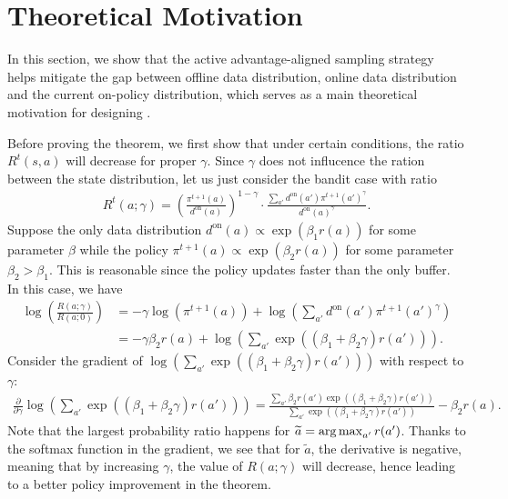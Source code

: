 \section{Theoretical Motivation}\label{app:theory_proof}
In this section, we show that the active advantage-aligned sampling strategy
helps mitigate the gap between offline data distribution, online data distribution and the current on-policy distribution, which serves as a main theoretical motivation for designing \algname.

\perfdiff*

Before proving the theorem, we first show that under certain conditions, the ratio $R^t(s, a)$ will decrease for proper $\gamma$. Since $\gamma$ does not influcence the ration between the state distribution, let us just consider the bandit case with ratio 
\begin{align*}
    R^t(a;\gamma) = \left(\frac{{\pi^{t+1}}(a)}{d^{\text{on}}(a)}\right)^{1-\gamma}  \cdot \frac{\sum_{a'}d^{\text{on}}(a') \pi^{t+1}(a')^\gamma}{d^{\text{on}}(a)^\gamma}.
\end{align*}
Suppose the only data distribution $d^{\text{on}}(a)\propto \exp(\beta_1 r(a))$ for some parameter $\beta$ while the policy $\pi^{t+1}(a) \propto \exp(\beta_2 r(a))$ for some parameter $\beta_2 > \beta_1$. This is reasonable since the policy updates faster than the only buffer.
In this case, we have 
\begin{align*}
    \log \left(\frac{R(a;\gamma)}{R(a;0)}\right) &= -\gamma \log(\pi^{t+1}(a)) + \log \left(\sum_{a'}d^{\text{on}}(a') \pi^{t+1}(a')^\gamma \right) \\
    &= -\gamma \beta_2 r(a) + \log \left(\sum_{a'}\exp((\beta_1 + \beta_2 \gamma) r(a')) \right).
\end{align*}
Consider the gradient of $\log \left(\sum_{a'}\exp((\beta_1 + \beta_2 \gamma) r(a')) \right)$ with respect to $\gamma$:
\begin{align*}
    \frac{\partial}{\partial \gamma} \log \left(\sum_{a'}\exp((\beta_1 + \beta_2 \gamma) r(a')) \right) = \frac{\sum_{a'} \beta_2 r(a') \exp((\beta_1 + \beta_2 \gamma) r(a'))}{\sum_{a'}\exp((\beta_1 + \beta_2 \gamma) r(a'))} - \beta_2 r(a).
\end{align*}
Note that the largest probability ratio happens for $\widetilde a = \mathop{\rm arg\,max}_{a'} r(a')$. Thanks to the softmax function in the gradient, we see that for $\tilde a$, the derivative is negative, meaning that by increasing $\gamma$, the value of $R(a;\gamma)$ will decrease, hence leading to a better policy improvement in the theorem.
